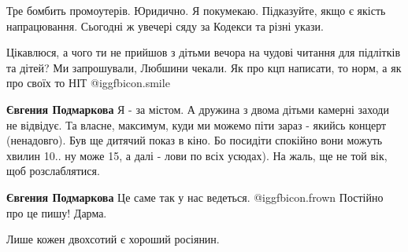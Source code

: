 \begin{itemize}
 
Тре бомбить промоутерів. Юридично. Я покумекаю. Підказуйте, якщо є якість
напрацювання. Сьогодні ж увечері сяду за Кодекси та різні укази.

 

Цікавлюся, а чого ти не прийшов з дітьми вечора на чудові читання для підлітків
та дітей? Ми запрошували, Любшини чекали. Як про кцп написати, то норм, а як
про своїх то НІТ  @igg{fbicon.smile} 

\begin{itemize}
 
\textbf{Євгения Подмаркова} Я - за містом. А дружина з двома дітьми камерні заходи не відвідує. Та власне, максимум, куди ми можемо піти зараз - якийсь концерт (ненадовго). Був ще дитячий показ в кіно. Бо посидіти спокійно вони можуть хвилин 10.. ну може 15, а далі - лови по всіх усюдах). На жаль, ще не той вік, щоб розслаблятися.

 
\textbf{Євгения Подмаркова} Це саме так у нас ведеться.  @igg{fbicon.frown}  Постійно про це пишу! Дарма.
\end{itemize}
 
 
Лише кожен двохсотий є хороший росіянин.


\end{itemize}
